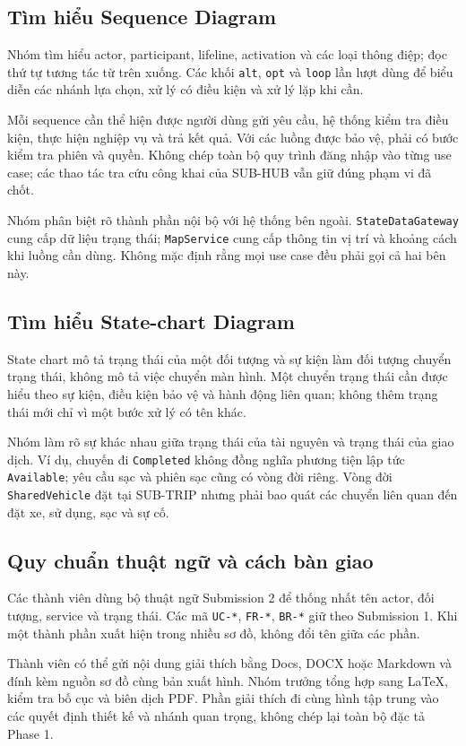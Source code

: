 \documentclass[10pt,a4paper]{article}
\begin{document}
\subsection{Tìm hiểu Sequence Diagram}
Nhóm tìm hiểu actor, participant, lifeline, activation và các loại thông điệp; đọc thứ tự tương tác từ trên xuống. Các khối \texttt{alt}, \texttt{opt} và \texttt{loop} lần lượt dùng để biểu diễn các nhánh lựa chọn, xử lý có điều kiện và xử lý lặp khi cần.

Mỗi sequence cần thể hiện được người dùng gửi yêu cầu, hệ thống kiểm tra điều kiện, thực hiện nghiệp vụ và trả kết quả. Với các luồng được bảo vệ, phải có bước kiểm tra phiên và quyền. Không chép toàn bộ quy trình đăng nhập vào từng use case; các thao tác tra cứu công khai của SUB-HUB vẫn giữ đúng phạm vi đã chốt.

Nhóm phân biệt rõ thành phần nội bộ với hệ thống bên ngoài. \texttt{StateDataGateway} cung cấp dữ liệu trạng thái; \texttt{MapService} cung cấp thông tin vị trí và khoảng cách khi luồng cần dùng. Không mặc định rằng mọi use case đều phải gọi cả hai bên này.

\subsection{Tìm hiểu State-chart Diagram}
State chart mô tả trạng thái của một đối tượng và sự kiện làm đối tượng chuyển trạng thái, không mô tả việc chuyển màn hình. Một chuyển trạng thái cần được hiểu theo sự kiện, điều kiện bảo vệ và hành động liên quan; không thêm trạng thái mới chỉ vì một bước xử lý có tên khác.

Nhóm làm rõ sự khác nhau giữa trạng thái của tài nguyên và trạng thái của giao dịch. Ví dụ, chuyến đi \texttt{Completed} không đồng nghĩa phương tiện lập tức \texttt{Available}; yêu cầu sạc và phiên sạc cũng có vòng đời riêng. Vòng đời \texttt{SharedVehicle} đặt tại SUB-TRIP nhưng phải bao quát các chuyển liên quan đến đặt xe, sử dụng, sạc và sự cố.

\subsection{Quy chuẩn thuật ngữ và cách bàn giao}
Các thành viên dùng bộ thuật ngữ Submission 2 để thống nhất tên actor, đối tượng, service và trạng thái. Các mã \texttt{UC-*}, \texttt{FR-*}, \texttt{BR-*} giữ theo Submission 1. Khi một thành phần xuất hiện trong nhiều sơ đồ, không đổi tên giữa các phần.

Thành viên có thể gửi nội dung giải thích bằng Docs, DOCX hoặc Markdown và đính kèm nguồn sơ đồ cùng bản xuất hình. Nhóm trưởng tổng hợp sang LaTeX, kiểm tra bố cục và biên dịch PDF. Phần giải thích đi cùng hình tập trung vào các quyết định thiết kế và nhánh quan trọng, không chép lại toàn bộ đặc tả Phase 1.
\end{document}
